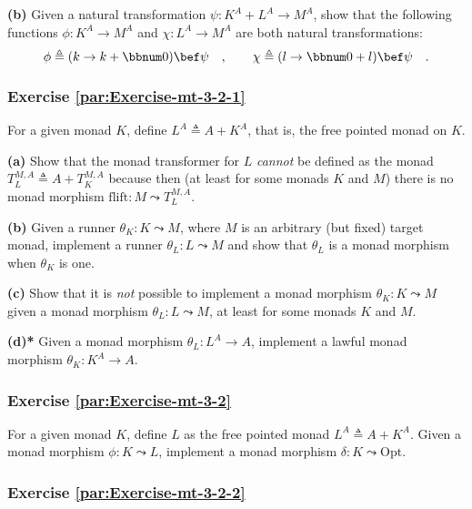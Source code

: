 \textbf{(b)} Given a natural transformation $\psi:K^{A}+L^{A}\rightarrow M^{A}$,
show that the following functions $\phi:K^{A}\rightarrow M^{A}$ and
$\chi:L^{A}\rightarrow M^{A}$ are both natural transformations:
\[
\phi\triangleq(k\rightarrow k+\bbnum 0)\bef\psi\quad,\quad\quad\chi\triangleq(l\rightarrow\bbnum 0+l)\bef\psi\quad.
\]


\subsubsection{Exercise \label{par:Exercise-mt-3-2-1}\ref{par:Exercise-mt-3-2-1}}

For a given monad $K$, define $L^{A}\triangleq A+K^{A}$, that is,
the free pointed monad on $K$.

\textbf{(a)} Show that the monad transformer for $L$ \emph{cannot}
be defined as the monad $T_{L}^{M,A}\triangleq A+T_{K}^{M,A}$ because
then (at least for some monads $K$ and $M$) there is no monad morphism
$\text{flift}:M\leadsto T_{L}^{M,A}$.

\textbf{(b)} Given a runner $\theta_{K}:K\leadsto M$, where $M$
is an arbitrary (but fixed) target monad, implement a runner $\theta_{L}:L\leadsto M$
and show that $\theta_{L}$ is a monad morphism when $\theta_{K}$
is one.

\textbf{(c)} Show that it is \emph{not} possible to implement a monad
morphism $\theta_{K}:K\leadsto M$ given a monad morphism $\theta_{L}:L\leadsto M$,
at least for some monads $K$ and $M$.

\textbf{(d){*}} Given a monad morphism $\theta_{L}:L^{A}\rightarrow A$,
implement a lawful monad morphism $\theta_{K}:K^{A}\rightarrow A$. 

\subsubsection{Exercise \label{par:Exercise-mt-3-2}\ref{par:Exercise-mt-3-2}}

For a given monad $K$, define $L$ as the free pointed monad
$L^{A}\triangleq A+K^{A}$. Given a monad morphism $\phi:K\leadsto L$,
implement a monad morphism $\delta:K\leadsto\text{Opt}$.

\subsubsection{Exercise \label{par:Exercise-mt-3-2-2}\ref{par:Exercise-mt-3-2-2}}

